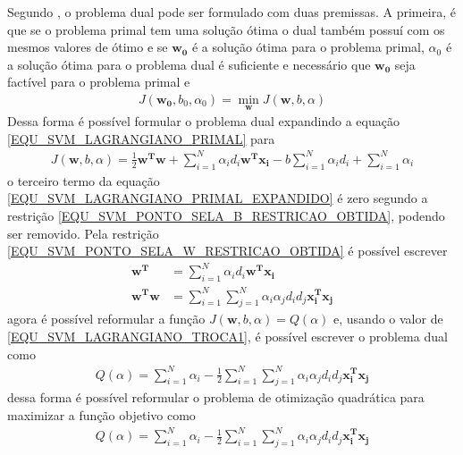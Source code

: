 Segundo , o problema dual pode ser formulado com duas premissas. A primeira, é que se o problema primal tem uma solução ótima o dual também possuí com os mesmos valores de ótimo e se \(\mathbf{w_{0}}\) é a solução ótima para o problema primal, \(\alpha_{0}\) é a solução ótima para o problema dual é suficiente e necessário que \(\mathbf{w_{0}}\) seja factível para o problema primal e
\begin{align}
J(\mathbf{w_{0}}, b_{0}, \alpha_{0}) = \min_{\mathbf{w}} J(\mathbf{w}, b, \alpha)
\end{align}
Dessa forma é possível formular o problema dual expandindo a equação \eqref{EQU_SVM_LAGRANGIANO_PRIMAL} para
\begin{align}
J(\mathbf{w}, b, \alpha) = \frac{1}{2}\mathbf{w^{T}}\mathbf{w} + \sum\limits_{i=1}^{N} \alpha_{i}d_{i}\mathbf{w^{T}}\mathbf{x_{i}} - b\sum\limits_{i=1}^{N} \alpha_{i}d_{i} + \sum\limits_{i=1}^{N} \alpha_{i} \label{EQU_SVM_LAGRANGIANO_PRIMAL_EXPANDIDO}
\end{align}
o terceiro termo da equação \eqref{EQU_SVM_LAGRANGIANO_PRIMAL_EXPANDIDO} é zero segundo a restrição \eqref{EQU_SVM_PONTO_SELA_B_RESTRICAO_OBTIDA}, podendo ser removido. Pela restrição \eqref{EQU_SVM_PONTO_SELA_W_RESTRICAO_OBTIDA} é possível escrever
\begin{align}
\mathbf{w^{T}} &= \sum\limits_{i=1}^{N} \alpha_{i}d_{i}\mathbf{w^{T}}\mathbf{x_{i}} \\
\mathbf{w^{T}}\mathbf{w} &= \sum\limits_{i=1}^{N} \sum\limits_{j=1}^{N} \alpha_{i}\alpha_{j}d_{i}d_{j}\mathbf{x_{i}^{T}}\mathbf{x_{j}} \label{EQU_SVM_LAGRANGIANO_TROCA1}
\end{align}
agora é possível reformular a função \(J(\mathbf{w}, b, \alpha) = Q(\alpha)\) e, usando o valor de \eqref{EQU_SVM_LAGRANGIANO_TROCA1}, é possível escrever o problema dual como
\begin{align}
Q(\alpha) = \sum\limits_{i=1}^{N} \alpha_{i} - \frac{1}{2} \sum\limits_{i=1}^{N} \sum\limits_{j=1}^{N} \alpha_{i}\alpha_{j}d_{i}d_{j}\mathbf{x_{i}^{T}}\mathbf{x_{j}} \label{EQU_SVM_LAGRANGIANO_DUAL}
\end{align}
dessa forma é possível reformular o problema de otimização quadrática para maximizar a função objetivo como
\begin{align}
Q(\alpha) = \sum\limits_{i=1}^{N} \alpha_{i} - \frac{1}{2} \sum\limits_{i=1}^{N} \sum\limits_{j=1}^{N} \alpha_{i}\alpha_{j}d_{i}d_{j}\mathbf{x_{i}^{T}}\mathbf{x_{j}} \label{EQU_SVM_OBJETIVO_DUAL}
\end{align}
